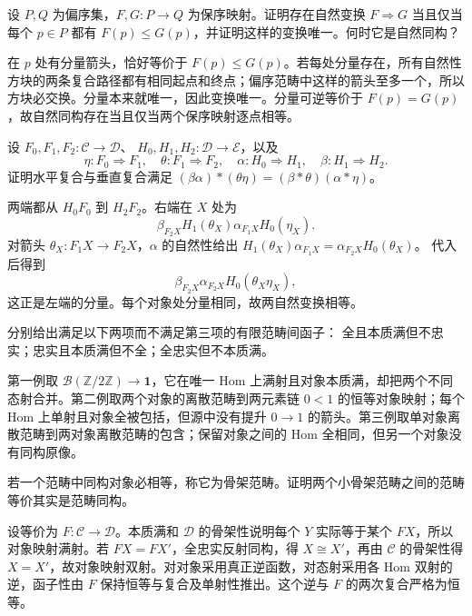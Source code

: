 \begin{exercise}\label{b4:ex:01-poset-natural-transformations}
	设 \(P,Q\) 为偏序集，\(F,G:P\rightarrow Q\) 为保序映射。证明存在自然变换 \(F\Rightarrow G\) 当且仅当每个 \(p\in P\) 都有 \(F(p)\le G(p)\)，并证明这样的变换唯一。何时它是自然同构？
\end{exercise}
\begin{solution}
	在 \(p\) 处有分量箭头，恰好等价于 \(F(p)\le G(p)\)。若每处分量存在，所有自然性方块的两条复合路径都有相同起点和终点；偏序范畴中这样的箭头至多一个，所以方块必交换。分量本来就唯一，因此变换唯一。分量可逆等价于 \(F(p)=G(p)\)，故自然同构存在当且仅当两个保序映射逐点相等。
\end{solution}

\begin{exercise}\label{b4:ex:01-interchange-law}
	设 \(F_0,F_1,F_2:\mathcal C\rightarrow\mathcal D\)、 \(H_0,H_1,H_2:\mathcal D\rightarrow\mathcal E\)，以及
	\[
		\eta:F_0\Rightarrow F_1,\quad\theta:F_1\Rightarrow F_2,\quad \alpha:H_0\Rightarrow H_1,\quad\beta:H_1\Rightarrow H_2.
	\]
	证明水平复合与垂直复合满足 \((\beta\alpha)*(\theta\eta)=(\beta*\theta)(\alpha*\eta)\)。
\end{exercise}
\begin{solution}
	两端都从 \(H_0F_0\) 到 \(H_2F_2\)。右端在 \(X\) 处为
	\[
		\beta_{F_2X}H_1(\theta_X)\alpha_{F_1X}H_0(\eta_X).
	\]
	对箭头 \(\theta_X:F_1X\rightarrow F_2X\)，\(\alpha\) 的自然性给出 \(H_1(\theta_X)\alpha_{F_1X}=\alpha_{F_2X}H_0(\theta_X)\)。 代入后得到
	\[
		\beta_{F_2X}\alpha_{F_2X}H_0(\theta_X\eta_X),
	\]
	这正是左端的分量。每个对象处分量相同，故两自然变换相等。
\end{solution}

\begin{exercise}\label{b4:ex:01-three-conditions-independent}
	分别给出满足以下两项而不满足第三项的有限范畴间函子： 全且本质满但不忠实；忠实且本质满但不全；全忠实但不本质满。
\end{exercise}
\begin{solution}
	第一例取 \(\mathcal B(\mathbb Z/2\mathbb Z)\rightarrow\mathbf1\)，它在唯一 Hom 上满射且对象本质满，却把两个不同态射合并。第二例取两个对象的离散范畴到两元素链 \(0<1\) 的恒等对象映射；每个 Hom 上单射且对象全被包括，但源中没有提升 \(0\rightarrow1\) 的箭头。第三例取单对象离散范畴到两对象离散范畴的包含；保留对象之间的 Hom 全相同，但另一个对象没有同构原像。
\end{solution}

\begin{exercise}\label{b4:ex:01-skeletal-equivalence}
	若一个范畴中同构对象必相等，称它为骨架范畴。证明两个小骨架范畴之间的范畴等价其实是范畴同构。
\end{exercise}
\begin{solution}
	设等价为 \(F:\mathcal C\rightarrow\mathcal D\)。本质满和 \(\mathcal D\) 的骨架性说明每个 \(Y\) 实际等于某个 \(FX\)，所以对象映射满射。若 \(FX=FX'\)，全忠实反射同构，得 \(X\cong X'\)，再由 \(\mathcal C\) 的骨架性得 \(X=X'\)，故对象映射双射。对对象采用真正逆函数，对态射采用各 Hom 双射的逆，函子性由 \(F\) 保持恒等与复合及单射性推出。这个逆与 \(F\) 的两次复合严格为恒等。
\end{solution}

